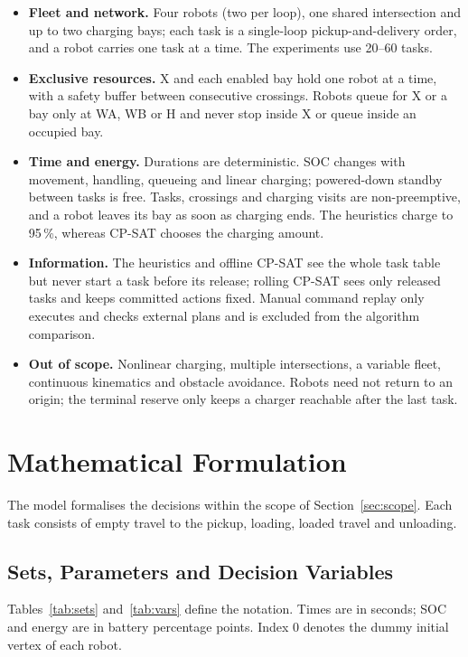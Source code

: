 \documentclass[11pt,a4paper]{article}
\newcommand{\pct}{\,\%}
\begin{document}
\begin{itemize}
\item \textbf{Fleet and network.} Four robots (two per loop), one shared intersection and up to two
  charging bays; each task is a single-loop pickup-and-delivery order, and a robot carries one task
  at a time. The experiments use 20--60 tasks.
\item \textbf{Exclusive resources.} X and each enabled bay hold one robot at a time, with a safety
  buffer between consecutive crossings. Robots queue for X or a bay only at WA, WB or H and never stop
  inside X or queue inside an occupied bay.
\item \textbf{Time and energy.} Durations are deterministic. SOC changes with movement, handling,
  queueing and linear charging; powered-down standby between tasks is free. Tasks, crossings and
  charging visits are non-preemptive, and a robot leaves its bay as soon as charging ends. The
  heuristics charge to 95\pct, whereas CP-SAT chooses the charging amount.
\item \textbf{Information.} The heuristics and offline CP-SAT see the whole task table but never start
  a task before its release; rolling CP-SAT sees only released tasks and keeps committed actions
  fixed. Manual command replay only executes and checks external plans and is excluded from the
  algorithm comparison.
\item \textbf{Out of scope.} Nonlinear charging, multiple intersections, a variable fleet, continuous
  kinematics and obstacle avoidance. Robots need not return to an origin; the terminal reserve only
  keeps a charger reachable after the last task.
\end{itemize}

\section{Mathematical Formulation}
\label{sec:model}

The model formalises the decisions within the scope of Section~\ref{sec:scope}. Each task consists of
empty travel to the pickup, loading, loaded travel and unloading.

\subsection{Sets, Parameters and Decision Variables}

Tables~\ref{tab:sets} and~\ref{tab:vars} define the notation. Times are in seconds; SOC and energy are
in battery percentage points. Index 0 denotes the dummy initial vertex of each robot.
\end{document}

